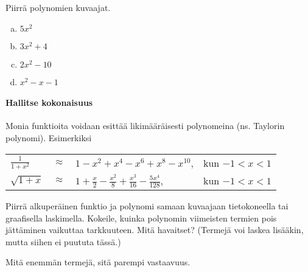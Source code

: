 \begin{tehtavasivu}
\begin{tehtava}
    Piirrä polynomien kuvaajat.
    \begin{enumerate}[a)]
        \item $5x^2$
        \item $3x^2+4$
        \item $2x^2-10$
        \item $x^2-x-1$
    \end{enumerate}
    \begin{vastaus}
        \item \begin{kuvaajapohja}{0.4}{-4}{4}{-1}{7}
			  \end{kuvaajapohja}
    	\item \begin{kuvaajapohja}{0.4}{-4}{4}{-1}{11}
			  \end{kuvaajapohja}
		\item \begin{kuvaajapohja}{0.4}{-4}{4}{-11}{1}
			  \end{kuvaajapohja}
		\item \begin{kuvaajapohja}{0.4}{-3}{5}{-2}{6}
			  \end{kuvaajapohja}
    \end{vastaus}
\end{tehtava}

\paragraph*{Hallitse kokonaisuus}

\begin{tehtava}
	Monia funktioita voidaan esittää likimääräisesti polynomeina (ns.
Taylorin polynomi). Esimerkiksi

	\begin{tabular}{lcll}
	$\frac{1}{1+x^2}$ &$\approx$ & $1-x^2+x^4-x^6+x^8-x^{10}$, & kun
$-1<x<1$ \\
	$\sqrt{1+x}$ & $\approx $ & $ 1+\frac{x}{2}
	-\frac{x^2}{8}+\frac{x^3}{16}-\frac{5x^4}{128}$, & kun $-1<x<1$
	\end{tabular}

	Piirrä alkuperäinen funktio ja polynomi samaan kuvaajaan tietokoneella
tai graafisella laskimella. Kokeile, kuinka polynomin viimeisten termien pois
jättäminen vaikuttaa tarkkuuteen. Mitä havaitset? (Termejä voi laskea lisääkin,
mutta siihen ei puututa tässä.)

	\begin{vastaus}
		Mitä enemmän termejä, sitä parempi vastaavuus.
	\end{vastaus}
\end{tehtava}

\end{tehtavasivu}
